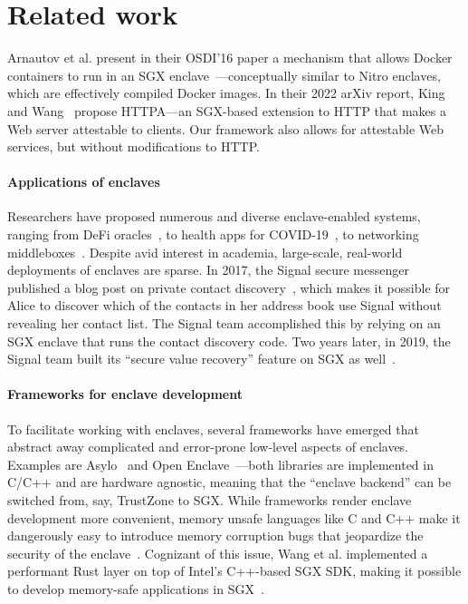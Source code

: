 \section{Related work}
\label{sec:related-work}

Arnautov et al. present in their OSDI'16 paper a mechanism that allows Docker
containers to run in an SGX enclave~\cite{Arnautov2016a}---conceptually similar
to Nitro enclaves, which are effectively compiled Docker images.
%
In their 2022 arXiv report, King and Wang~\cite{King2022a} propose HTTPA---an
SGX-based extension to HTTP that makes a Web server attestable to clients.  Our
framework also allows for attestable Web services, but without modifications to
HTTP.

\paragraph{Applications of enclaves}

Researchers have proposed numerous and diverse enclave-enabled systems, ranging
from DeFi oracles~\cite{Zhang16a}, to health apps for
COVID-19~\cite{Mailthody21a}, to networking middleboxes~\cite{Han17a}.  Despite
avid interest in academia, large-scale, real-world deployments of enclaves are
sparse.  In 2017, the Signal secure messenger published a blog post on private
contact discovery~\cite{Marlinspike17a}, which makes it possible for Alice to
discover which of the contacts in her address book use Signal without revealing
her contact list.  The Signal team accomplished this by relying on an SGX
enclave that runs the contact discovery code.  Two years later, in 2019, the
Signal team built its ``secure value recovery'' feature on SGX as
well~\cite{Lund19a}.

\paragraph{Frameworks for enclave development}

To facilitate working with enclaves, several frameworks have emerged that
abstract away complicated and error-prone low-level aspects of enclaves.
Examples are Asylo~\cite{asylo} and Open Enclave~\cite{openenclave}---both
libraries are implemented in C/C++ and are hardware agnostic, meaning that the
``enclave backend'' can be switched from, say, TrustZone to SGX.  While
frameworks render enclave development more convenient, memory unsafe languages
like C and C++ make it dangerously easy to introduce memory corruption bugs
that jeopardize the security of the enclave~\cite{Lee2017a}.  Cognizant of
this issue, Wang et al. implemented a performant Rust layer on top of Intel's
C++-based SGX SDK, making it possible to develop memory-safe applications in
SGX~\cite{Wang2019a}.

